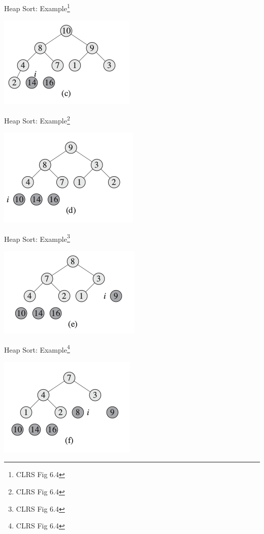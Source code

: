 \documentclass{beamer}
\begin{document}
\begin{frame}{Heap Sort: Example\footnote{CLRS Fig 6.4}}
    \begin{center}
        \includegraphics[scale=0.7]{heapSort3.png}
    \end{center}
\end{frame}


\begin{frame}{Heap Sort: Example\footnote{CLRS Fig 6.4}}
    \begin{center}
        \includegraphics[scale=0.7]{heapSort4.png}
    \end{center}
\end{frame}


\begin{frame}{Heap Sort: Example\footnote{CLRS Fig 6.4}}
    \begin{center}
        \includegraphics[scale=0.7]{heapSort5.png}
    \end{center}
\end{frame}


\begin{frame}{Heap Sort: Example\footnote{CLRS Fig 6.4}}
    \begin{center}
        \includegraphics[scale=0.7]{heapSort6.png}
    \end{center}
\end{frame}
\end{document}
